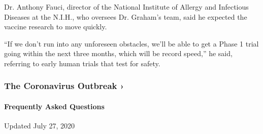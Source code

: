 Dr. Anthony Fauci, director of the National Institute of Allergy and
Infectious Diseases at the N.I.H., who oversees Dr. Graham's team, said
he expected the vaccine research to move quickly.

``If we don't run into any unforeseen obstacles, we'll be able to get a
Phase 1 trial going within the next three months, which will be record
speed,'' he said, referring to early human trials that test for safety.

\href{https://www.nytimes.com/news-event/coronavirus?action=click\&pgtype=Article\&state=default\&region=MAIN_CONTENT_3\&context=storylines_faq}{}

\hypertarget{the-coronavirus-outbreak-}{%
\subsubsection{The Coronavirus Outbreak
›}\label{the-coronavirus-outbreak-}}

\hypertarget{frequently-asked-questions}{%
\paragraph{Frequently Asked
Questions}\label{frequently-asked-questions}}

Updated July 27, 2020

